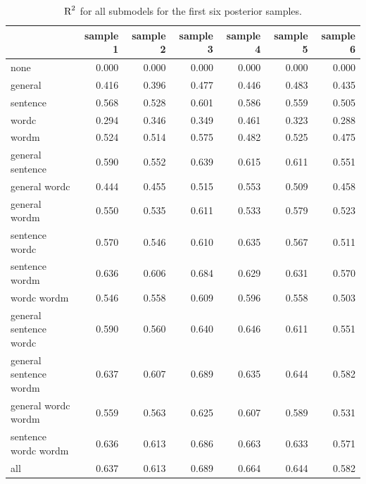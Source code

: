\documentclass[11pt,a4paper,twoside]{book}
\newenvironment{knitrout}{}{} %
\begin{document}
\begin{knitrout}
\color{fgcolor}\begin{table}

\caption{\label{tab:empirical.data.postsample3}$ \text{R}^2$ for all submodels for the first six posterior samples.}
\centering
\begin{tabular}[t]{lrrrrrr}
\toprule
  & sample 1 & sample 2 & sample 3 & sample 4 & sample 5 & sample 6\\
\midrule
none & 0.000 & 0.000 & 0.000 & 0.000 & 0.000 & 0.000\\
general & 0.416 & 0.396 & 0.477 & 0.446 & 0.483 & 0.435\\
sentence & 0.568 & 0.528 & 0.601 & 0.586 & 0.559 & 0.505\\
wordc & 0.294 & 0.346 & 0.349 & 0.461 & 0.323 & 0.288\\
wordm & 0.524 & 0.514 & 0.575 & 0.482 & 0.525 & 0.475\\
general sentence & 0.590 & 0.552 & 0.639 & 0.615 & 0.611 & 0.551\\
general wordc & 0.444 & 0.455 & 0.515 & 0.553 & 0.509 & 0.458\\
general wordm & 0.550 & 0.535 & 0.611 & 0.533 & 0.579 & 0.523\\
sentence wordc & 0.570 & 0.546 & 0.610 & 0.635 & 0.567 & 0.511\\
sentence wordm & 0.636 & 0.606 & 0.684 & 0.629 & 0.631 & 0.570\\
wordc wordm & 0.546 & 0.558 & 0.609 & 0.596 & 0.558 & 0.503\\
general sentence wordc & 0.590 & 0.560 & 0.640 & 0.646 & 0.611 & 0.551\\
general sentence wordm & 0.637 & 0.607 & 0.689 & 0.635 & 0.644 & 0.582\\
general wordc wordm & 0.559 & 0.563 & 0.625 & 0.607 & 0.589 & 0.531\\
sentence wordc wordm & 0.636 & 0.613 & 0.686 & 0.663 & 0.633 & 0.571\\
all & 0.637 & 0.613 & 0.689 & 0.664 & 0.644 & 0.582\\
\bottomrule
\end{tabular}
\end{table}


\end{knitrout}
\end{document}
